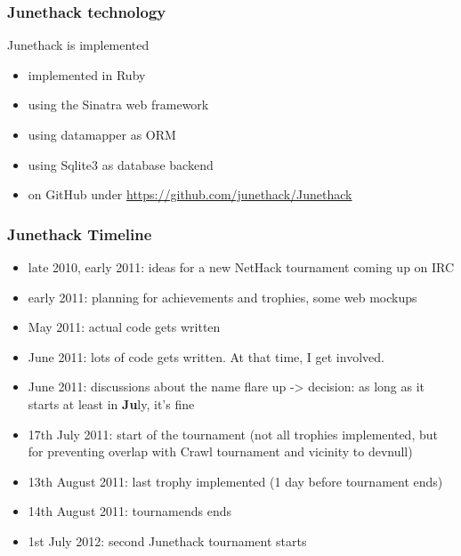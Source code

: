 \documentclass{beamer}
\begin{document}
\begin{frame}
\frametitle{Junethack technology}
  Junethack is implemented\pause
  \begin{itemize}[<+->]
    \item implemented in Ruby
    \item using the Sinatra web framework
    \item using datamapper as ORM
    \item using Sqlite3 as database backend
    \item on GitHub under \url{https://github.com/junethack/Junethack}
  \end{itemize}
\end{frame}

\begin{frame}
\frametitle{Junethack Timeline}
  \pause
  \begin{itemize}[<+->]
    \item late 2010, early 2011: ideas for a new NetHack tournament coming up on IRC
    \item early 2011: planning for achievements and trophies, some web mockups
    \item May 2011: actual code gets written
    \item June 2011: lots of code gets written. At that time, I get involved.
    \item June 2011: discussions about the name flare up -> decision: as long as it starts at least in \textbf{Ju}ly, it's fine
    \item 17th July 2011: start of the tournament (not all trophies implemented, but for preventing overlap with Crawl tournament and vicinity to devnull)
    \item 13th August 2011: last trophy implemented (1 day before tournament ends)
    \item 14th August 2011: tournamends ends
    \item 1st July 2012: second Junethack tournament starts
  \end{itemize}
\end{frame}

\end{document}
